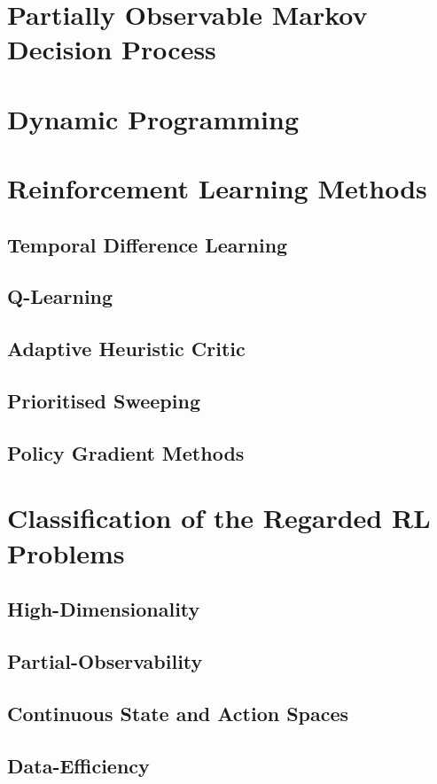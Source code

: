 \documentclass[officiallayout]{tktla}
\begin{document}
\section{Partially Observable Markov Decision Process}
\section{Dynamic Programming}
\section{Reinforcement Learning Methods}
\subsection{Temporal Difference Learning}
\subsection{Q-Learning}
\subsection{Adaptive Heuristic Critic}
\subsection{Prioritised Sweeping}
\subsection{Policy Gradient Methods}

\section{Classification of the Regarded RL Problems}
\subsection{High-Dimensionality}
\subsection{Partial-Observability}
\subsection{Continuous State and Action Spaces}
\subsection{Data-Efficiency}
\end{document}
